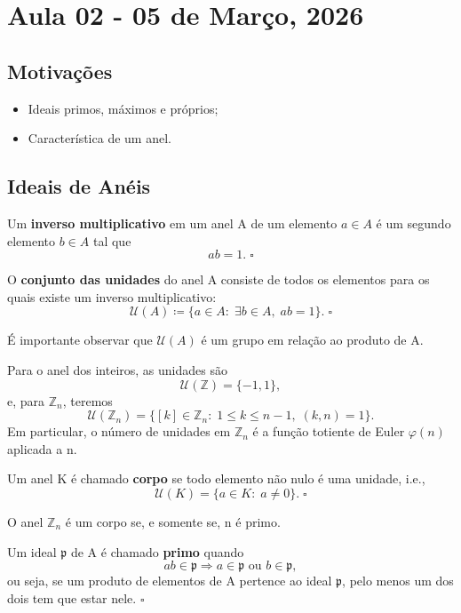 \documentclass[../algebraIII_notes.tex]{subfiles}
\begin{document}
\section{Aula 02 - 05 de Março, 2026}
\subsection{Motivações}
\begin{itemize}
	\item Ideais primos, máximos e próprios;
	\item Característica de um anel.
\end{itemize}
\subsection{Ideais de Anéis}
\begin{def*}
	Um \textbf{inverso multiplicativo} em um anel A de um elemento \(a\in A\) é um segundo elemento \(b\in A\) tal que
	\[
		ab = 1.\; \square
	\]
\end{def*}
\begin{def*}
	O \textbf{conjunto das unidades} do anel A consiste de todos os elementos para os quais existe um inverso multiplicativo:
	\[
		\mathcal{U}(A)\coloneqq \{a\in A:\; \exists b\in A,\; ab =1\}.\; \square
	\]
\end{def*}
É importante observar que \(\mathcal{U}(A)\) é um grupo em relação ao produto de A.
\begin{example}
	Para o anel dos inteiros, as unidades são
	\[
		\mathcal{U}(\mathbb{Z}) = \{-1,1\},
	\]
	e, para \(\mathbb{Z}_{n}\), teremos
	\[
		\mathcal{U}(\mathbb{Z}_{n}) = \{[k]\in \mathbb{Z}_{n}:\; 1\leq k\leq n-1,\; (k, n)=1\}.
	\]
	Em particular, o número de unidades em \(\mathbb{Z}_{n}\) é a função totiente de Euler \(\varphi (n)\) aplicada a n.
\end{example}
\begin{def*}
	Um anel K é chamado \textbf{corpo} se todo elemento não nulo é uma unidade, i.e.,
	\[
		\mathcal{U}(K) = \{a\in K:\; a\neq 0\}.\; \square
	\]
\end{def*}
\begin{example}
	O anel \(\mathbb{Z}_{n}\) é um corpo se, e somente se, n é primo.
\end{example}
\begin{def*}
	Um ideal \(\mathfrak{p}\) de A é chamado \textbf{primo} quando
	\[
		ab \in \mathfrak{p} \Rightarrow a\in \mathfrak{p} \text{ ou } b\in \mathfrak{p},
	\]
	ou seja, se um produto de elementos de A pertence ao ideal \(\mathfrak{p}\), pelo menos um dos dois tem que estar nele. \(\square\)
\end{def*}
\end{document}
